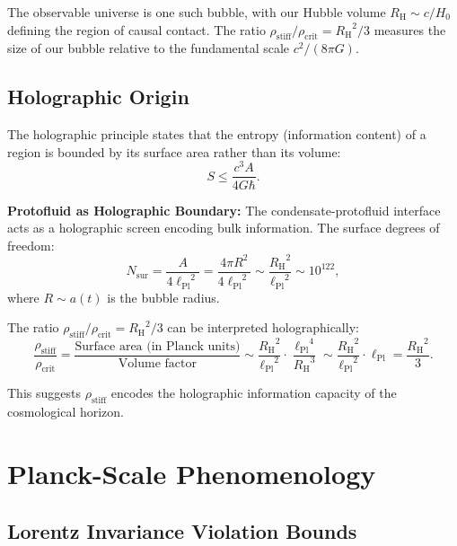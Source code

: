 \documentclass[11pt,a4paper]{article}
\newcommand{\lPl}{\ensuremath{\ell_{\mathrm{Pl}}}}
\newcommand{\rhocrit}{\ensuremath{\rho_{\mathrm{crit}}}}
\newcommand{\rhostiff}{\ensuremath{\rho_{\mathrm{stiff}}}}
\newcommand{\RH}{\ensuremath{R_{\mathrm{H}}}}
\theoremstyle{definition}
\theoremstyle{remark}
\begin{document}
The observable universe is one such bubble, with our Hubble volume $\RH \sim c/H_0$ defining the region of causal contact. The ratio $\rhostiff/\rhocrit = \RH^2/3$ measures the size of our bubble relative to the fundamental scale $c^2/(8\pi G)$.

\subsection{Holographic Origin}
\label{sec:holographic_protofluid}

The holographic principle \cite{tHooft1993,Susskind1995} states that the entropy (information content) of a region is bounded by its surface area rather than its volume:
\begin{equation}
S \leq \frac{c^3 A}{4 G \hbar}.
\end{equation}

\textbf{Protofluid as Holographic Boundary:} The condensate-protofluid interface acts as a holographic screen encoding bulk information. The surface degrees of freedom:
\begin{equation}
N_{\mathrm{sur}} = \frac{A}{4\lPl^2} = \frac{4\pi R^2}{4\lPl^2} \sim \frac{\RH^2}{\lPl^2} \sim 10^{122},
\end{equation}
where $R \sim a(t)$ is the bubble radius.

The ratio $\rhostiff/\rhocrit = \RH^2/3$ can be interpreted holographically:
\begin{equation}
\frac{\rhostiff}{\rhocrit} = \frac{\text{Surface area (in Planck units)}}{\text{Volume factor}} \sim \frac{\RH^2}{\lPl^2} \cdot \frac{\lPl^4}{\RH^3} \sim \frac{\RH^2}{\lPl^2} \cdot \lPl = \frac{\RH^2}{3}.
\end{equation}

This suggests $\rhostiff$ encodes the holographic information capacity of the cosmological horizon.

\section{Planck-Scale Phenomenology}
\label{sec:planck_phenom}

\subsection{Lorentz Invariance Violation Bounds}
\label{sec:liv_bounds}
\end{document}
